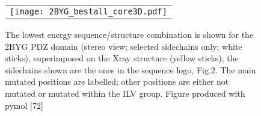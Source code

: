     \begin{figure}[!htbp]
      \centering
      \begin{tabular}{c}
        \texttt{[image: 2BYG\_bestall\_core3D.pdf]} 
      \end{tabular}
      
      \caption[width=1cm]{\small The lowest energy sequence/structure combination is shown for the 2BYG PDZ domain (stereo view; selected sidechains only; white sticks), superimposed on the Xray structure (yellow sticks); the sidechains shown are the ones in the sequence logo, Fig.2. The main mutated positions are labelled; other positions are either not mutated or mutated within the ILV group. Figure produced with pymol [72]}
      \label{fig:logos}
    \end{figure}



